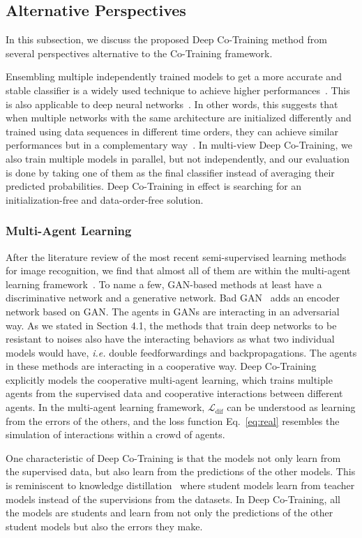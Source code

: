 \documentclass[runningheads]{llncs}
\begin{document}
\subsection{Alternative Perspectives}
In this subsection, we discuss the proposed Deep Co-Training method from several perspectives alternative to the Co-Training framework.

Ensembling multiple independently trained models to get a more accurate and stable classifier is a widely used technique to achieve higher performances~\cite{bagging}.
This is also applicable to deep neural networks~\cite{ensemble1,ensemble2}.
In other words, this suggests that when multiple networks with the same architecture are initialized differently and trained using data sequences in different time orders, they can achieve similar performances but in a complementary way~\cite{twoculture}.
In multi-view Deep Co-Training, we also train multiple models in parallel, but not independently, and our evaluation is done by taking one of them as the final classifier instead of averaging their predicted probabilities.
Deep Co-Training in effect is searching for an initialization-free and data-order-free solution.

\subsubsection{Multi-Agent Learning}
After the literature review of the most recent semi-supervised learning methods for image recognition, we find that almost all of them are within the multi-agent learning framework~\cite{malearn}.
To name a few, GAN-based methods at least have a discriminative network and a generative network.
Bad GAN~\cite{badgan} adds an encoder network based on GAN.
The agents in GANs are interacting in an adversarial way.
As we stated in Section 4.1, the methods that train deep networks to be resistant to noises also have the interacting behaviors as what two individual models would have, \textit{i.e.} double feedforwardings and backpropagations.
The agents in these methods are interacting in a cooperative way.
Deep Co-Training explicitly models the cooperative multi-agent learning, which trains multiple agents from the supervised data and cooperative interactions between different agents.
In the multi-agent learning framework, $\mathcal{L}_{\text{dif}}$ can be understood as learning from the errors of the others, and the loss function Eq.~\ref{eq:real} resembles the simulation of interactions within a crowd of agents.

One characteristic of Deep Co-Training is that the models not only learn from the supervised data, but also learn from the predictions of the other models.
This is reminiscent to knowledge distillation~\cite{distill} where student models learn from teacher models instead of the supervisions from the datasets.
In Deep Co-Training, all the models are students and learn from not only the predictions of the other student models but also the errors they make.
\end{document}
